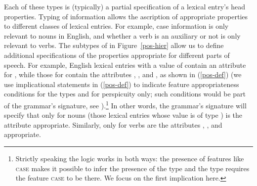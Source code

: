 \documentclass[output=paper,biblatex,babelshorthands,newtxmath,draftmode,colorlinks,citecolor=brown]{langscibook}
\begin{document}
Each of these types is (typically) a partial specification of a lexical entry's head properties.
Typing of  information allows the ascription of appropriate properties to different classes of lexical entries. For example, case information is only relevant to nouns in English, and whether a verb is an auxiliary or not is only relevant to verbs. 
The subtypes of  in Figure~\ref{pos-hier} allow us to define additional specifications of the properties appropriate for different parts of speech.
For example, English lexical entries with a  value of  contain an attribute for , while those for  contain the attributes , , and , as shown in (\ref{pos-def}) (we use implicational statements in (\ref{pos-def}) to indicate feature appropriateness conditions for the types  and  for perspicuity only; such conditions would be part of the grammar's signature, see \crossrefchaptert[\pageref{formal:page-signature}]{formal-background}).\footnote{%
Strictly speaking the logic works in both ways: the presence of features like \textsc{case} makes it possible to infer the presence of the type  and the type  requires the feature \textsc{case} to be there. We focus on the first implication here.
}
In other words, the grammar's signature will specify that only for nouns (those lexical entries whose  value is of type ) is the attribute  appropriate.
Similarly, only for verbs are the attributes , , and  appropriate.
\end{document}

